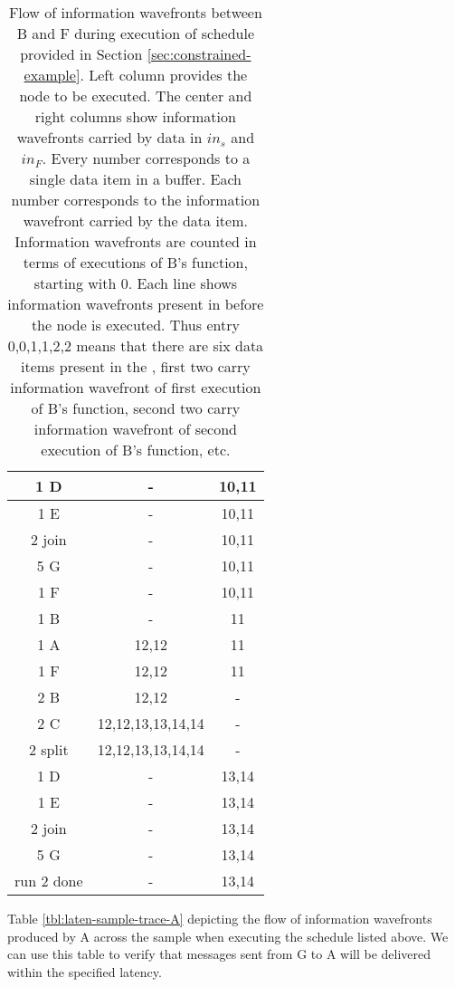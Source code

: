 \begin{table}
\begin{tabular}{|c|c|c|}
\hline 1 D & - & 10,11 \\
\hline 1 E & - & 10,11 \\
\hline 2 join & - & 10,11 \\
\hline 5 G & - & 10,11 \\
\hline 1 F & - & 10,11 \\
\hline 1 B & - & 11 \\
\hline 1 A & 12,12 & 11 \\
\hline 1 F & 12,12 & 11 \\
\hline 2 B & 12,12 & - \\
\hline 2 C & 12,12,13,13,14,14 & - \\
\hline 2 split & 12,12,13,13,14,14 & - \\
\hline 1 D & - & 13,14 \\
\hline 1 E & - & 13,14 \\
\hline 2 join & - & 13,14 \\
\hline 5 G & - & 13,14 \\
\hline run 2 done & - & 13,14 \\
\hline
\end{tabular}
\begin{comment}
\hline
\end{comment}
\caption[Flow of information wavefronts between {\filters} B an dF
in Figure \ref{fig:constrained-example}]{Flow of information
wavefronts between {\filters} B and F during execution of schedule
provided in Section \ref{sec:constrained-example}. Left column
provides the node to be executed.  The center and right columns
show information wavefronts carried by data in {\Channels} $in_s$
and $in_F$.  Every number corresponds to a single data item in a
buffer.  Each number corresponds to the information wavefront
carried by the data item. Information wavefronts are counted in
terms of executions of {\filter} B's {\work} function, starting
with 0.  Each line shows information wavefronts present in
{\Channels} before the node is executed. Thus entry 0,0,1,1,2,2
means that there are six data items present in the {\Channel}, first
two carry information wavefront of first execution of B's {\work}
function, second two carry information wavefront of second
execution of B's {\work} function, etc.}
\label{tbl:laten-sample-trace-B}
\end{table}

Table \ref{tbl:laten-sample-trace-A} depicting the flow of
information wavefronts produced by {\filter} A across the sample
{\pipeline} when executing the schedule listed above.  We can use
this table to verify that messages sent from {\filter} G to {\filter}
A will be delivered within the specified latency.

